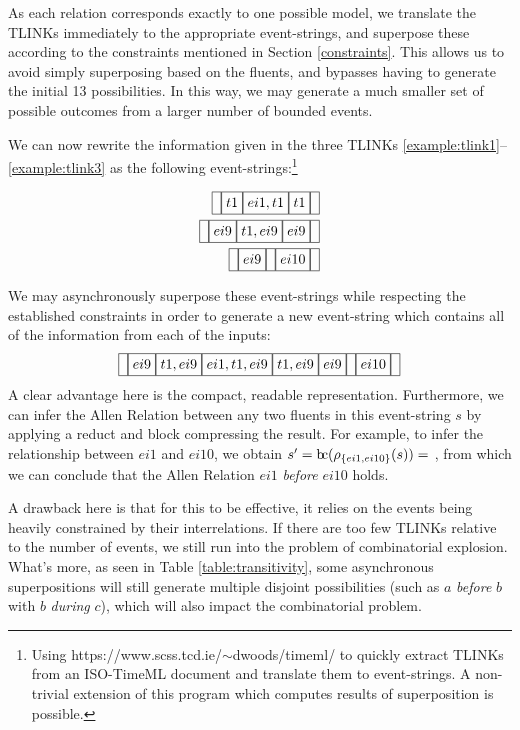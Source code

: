 \documentclass[a4paper,11pt,leqno]{article}
\newcommand{\bc}{{\rm b\!c}}
\newcommand{\vph}[1]{\vphantom{#1}}
\newcommand{\ebox}[1]{\fbox{$\vph{',}#1$}}
\begin{document}
As each relation corresponds exactly to one possible model, we translate the 
TLINKs immediately to the appropriate event-strings, and superpose these 
according to the constraints mentioned in Section \ref{constraints}. This 
allows us to avoid simply superposing based on the fluents, and bypasses having 
to generate the initial 13 possibilities. In this way, we may generate a much 
smaller set of possible outcomes from a larger number of bounded events.

We can now rewrite the information given in the three TLINKs 
\ref{example:tlink1}--\ref{example:tlink3} as the following 
event-strings:\footnote{Using https://www.scss.tcd.ie/$\sim$dwoods/timeml/ to 
quickly extract TLINKs from an ISO-TimeML document and translate them to 
event-strings. A non-trivial extension of this program which computes results 
of superposition is possible.}

\begin{subequations}
\begin{align}
\ebox{}\ebox{t1}\ebox{ei1,t1}\ebox{t1}\ebox{}\\
\ebox{}\ebox{ei9}\ebox{t1,ei9}\ebox{ei9}\ebox{}\\
\ebox{}\ebox{ei9}\ebox{}\ebox{ei10}\ebox{}
\end{align}
\end{subequations}

We may asynchronously superpose these event-strings while respecting the 
established constraints in order to generate a new event-string which contains 
all of the information from each of the inputs:
\begin{align}
\ebox{}\ebox{ei9}\ebox{t1,ei9}\ebox{ei1,t1,ei9}\ebox{t1,ei9}\ebox{ei9}\ebox{}\ebox{ei10}\ebox{}
\end{align}
A clear advantage here is the compact, readable representation. Furthermore, we 
can infer the Allen Relation between any two fluents in this event-string $s$ 
by applying a reduct and block compressing the result. For example, to infer the
relationship between $ei1$ and $ei10$, we obtain $s' = 
\bc{}(\rho_{\{ei1,ei10\}}(s)) = $ \ebox{}\ebox{ei1}\ebox{}\ebox{ei10}\ebox{}, 
from which we can conclude that the Allen Relation $ei1$ \textit{before} $ei10$ 
holds.

A drawback here is that for this to be effective, it relies on the events being 
heavily constrained by their interrelations. If there are too few TLINKs 
relative to the number of events, we still run into the problem of 
combinatorial explosion. What's more, as seen in Table 
\ref{table:transitivity}, some asynchronous superpositions will still generate 
multiple disjoint possibilities (such as $a$ \textit{before} $b$ with $b$ 
\textit{during} $c$), which will also impact the combinatorial problem.
\end{document}
